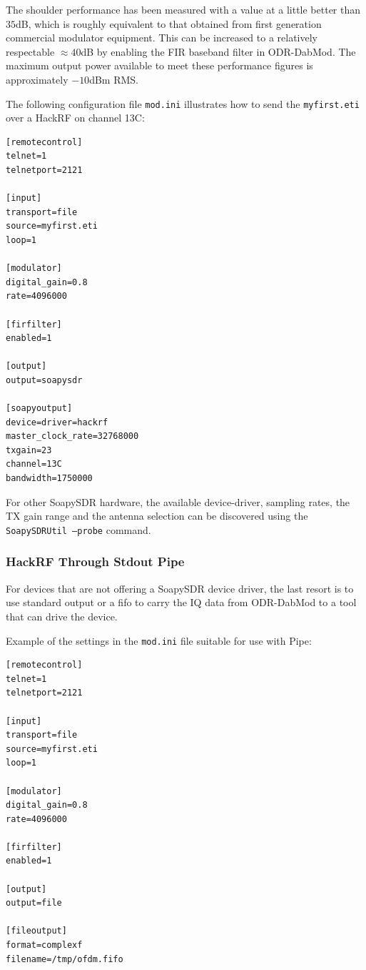 The shoulder performance has been measured with a value at a little
better than $35$dB, which is roughly equivalent to that obtained from first
generation commercial modulator equipment. This can be increased to a relatively
respectable $\approx 40$dB by enabling the FIR baseband filter in ODR-DabMod.
The maximum output power available to meet these performance figures is
approximately $-10$dBm RMS.

The following configuration file \texttt{mod.ini}
illustrates how to send the \texttt{myfirst.eti} over a HackRF on channel
13C:

\begin{lstlisting}
[remotecontrol]
telnet=1
telnetport=2121

[input]
transport=file
source=myfirst.eti
loop=1

[modulator]
digital_gain=0.8
rate=4096000

[firfilter]
enabled=1

[output]
output=soapysdr

[soapyoutput]
device=driver=hackrf
master_clock_rate=32768000
txgain=23
channel=13C
bandwidth=1750000
\end{lstlisting}


For other SoapySDR hardware, the available device-driver, sampling rates, the 
TX gain range and the antenna selection can be discovered using the 
\texttt{SoapySDRUtil --probe} command.

\subsubsection{HackRF Through Stdout Pipe}
For devices that are not offering a SoapySDR device driver, the last resort is
to use standard output or a fifo to carry the IQ data from ODR-DabMod to a tool
that can drive the device.

Example of the settings in the \texttt{mod.ini} file suitable for use with Pipe:

\begin{lstlisting}
[remotecontrol]
telnet=1
telnetport=2121

[input]
transport=file
source=myfirst.eti
loop=1

[modulator]
digital_gain=0.8
rate=4096000

[firfilter]
enabled=1

[output]
output=file

[fileoutput]
format=complexf
filename=/tmp/ofdm.fifo

\end{lstlisting}

